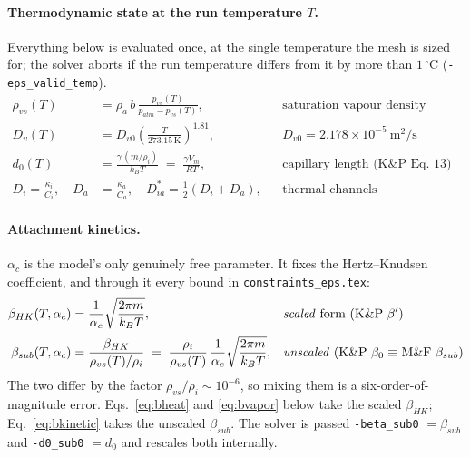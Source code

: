 %

\paragraph{Thermodynamic state at the run temperature $T$.}
Everything below is evaluated once, at the single temperature the mesh is
sized for; the solver aborts if the run temperature differs from it by more
than $1\,^\circ$C (\texttt{-eps\_valid\_temp}).
%
\begin{align}
  \rho_{vs}(T) &= \rho_{a}\,b\,\frac{p_{vs}(T)}{p_{atm}-p_{vs}(T)},
  &&\text{saturation vapour density (ASHRAE)} \label{eq:rhovs}\\[2pt]
  D_v(T) &= D_{v0}\left(\frac{T}{273.15\,\mathrm{K}}\right)^{1.81},
  &&D_{v0} = 2.178\times10^{-5}\ \mathrm{m^2/s} \label{eq:Dv}\\[2pt]
  d_0(T) &= \frac{\gamma\,(m/\rho_i)}{k_B T} \;=\; \frac{\gamma V_m}{R T},
  &&\text{capillary length (K\&P Eq.\ 13)} \label{eq:d0}\\[2pt]
  D_i = \frac{\kappa_i}{C_i}, \quad D_a &= \frac{\kappa_a}{C_a}, \quad
  D^{*}_{ia} = \tfrac{1}{2}\left(D_i + D_a\right),
  &&\text{thermal channels} \label{eq:Dheat}
\end{align}

\paragraph{Attachment kinetics.}
$\alpha_c$ is the model's only genuinely free parameter. It fixes the
Hertz--Knudsen coefficient, and through it every bound in
\texttt{constraints\_eps.tex}:
%
\begin{align}
  \beta_{HK}(T,\alpha_c) &= \frac{1}{\alpha_c}\sqrt{\frac{2\pi m}{k_B T}},
  &&\text{\emph{scaled} form (K\&P $\beta'$)} \label{eq:betahk}\\[2pt]
  \beta_{sub}(T,\alpha_c) &= \frac{\beta_{HK}}{\rho_{vs}(T)/\rho_i}
  \;=\; \frac{\rho_i}{\rho_{vs}(T)}\,\frac{1}{\alpha_c}
        \sqrt{\frac{2\pi m}{k_B T}},
  &&\text{\emph{unscaled} (K\&P $\beta_0 \equiv$ M\&F $\beta_{sub}$)}
  \label{eq:betasub}
\end{align}
%
The two differ by the factor $\rho_{vs}/\rho_i \sim 10^{-6}$, so mixing them
is a six-order-of-magnitude error. Eqs.~\eqref{eq:bheat} and \eqref{eq:bvapor}
below take the scaled $\beta_{HK}$; Eq.~\eqref{eq:bkinetic} takes the unscaled
$\beta_{sub}$. The solver is passed \texttt{-beta\_sub0} $=\beta_{sub}$ and
\texttt{-d0\_sub0} $=d_0$ and rescales both internally.

